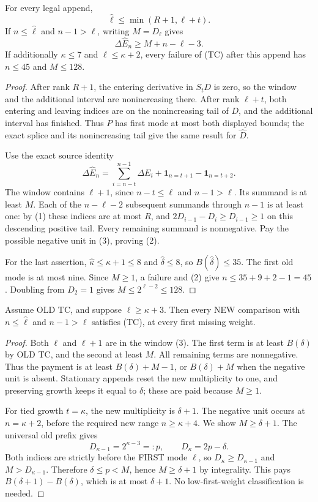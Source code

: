 \begin{lemma}
For every legal append,
\[
                  \widehat\ell\le\min(R+1,\ell+t).       \tag{1}
\]
If $n\le\widehat\ell$ and $n-1>\ell$, writing $M=D_\ell$ gives
\[
                 \Delta\widehat E_n\ge M+n-\ell-3.       \tag{2}
\]
If additionally $\kappa\le7$ and $\ell\le\kappa+2$, every failure
of (TC) after this append has $n\le45$ and $M\le128$.
\end{lemma}
\begin{proof}
After rank $R+1$, the entering derivative in $S_tD$ is zero, so
the window and the additional interval are nonincreasing there.
After rank $\ell+t$, both entering and leaving indices are on the
nonincreasing tail of $D$, and the additional interval has finished.
Thus $P$ has first mode at most both displayed bounds; the exact
splice and its nonincreasing tail give the same result for $\widehat D$.

Use the exact source identity
\[
 \Delta\widehat E_n=\sum_{i=n-t}^{n-1}\Delta E_i
              +\mathbf1_{n=t+1}-\mathbf1_{n=t+2}.       \tag{3}
\]
The window contains $\ell+1$, since $n-t\le\ell$ and
$n-1>\ell$. Its summand is at least $M$.
Each of the $n-\ell-2$ subsequent summands through $n-1$ is
at least one: by (1) these indices are at most $R$, and
$2D_{i-1}-D_i\ge D_{i-1}\ge1$ on this descending positive tail.
Every remaining summand is nonnegative. Pay the possible negative
unit in (3), proving (2).

For the last assertion, $\widehat\kappa\le\kappa+1\le8$ and
$\widehat\delta\le8$, so $B(\widehat\delta)\le35$.
The first old mode is at most nine. Since $M\ge1$, a failure
and (2) give $n\le35+9+2-1=45$.
Doubling from $D_2=1$ gives $M\le2^{\ell-2}\le128$.
\end{proof}

\begin{lemma}
Assume OLD TC, and suppose $\ell\ge\kappa+3$.
Then every NEW comparison with $n\le\widehat\ell$ and $n-1>\ell$
satisfies (TC), at every first missing weight.
\end{lemma}
\begin{proof}
Both $\ell$ and $\ell+1$ are in the window (3). The first term
is at least $B(\delta)$ by OLD TC, and the second at least $M$.
All remaining terms are nonnegative. Thus the payment is at least
$B(\delta)+M-1$, or $B(\delta)+M$ when the negative unit is absent.
Stationary appends reset the new multiplicity to one, and preserving
growth keeps it equal to $\delta$; these are paid because $M\ge1$.

For tied growth $t=\kappa$, the new multiplicity is $\delta+1$.
The negative unit occurs at $n=\kappa+2$, before the required
new range $n\ge\kappa+4$. We show $M\ge\delta+1$.
The universal old prefix gives
\[
       D_{\kappa-1}=2^{\kappa-3}=:p,
              \qquad D_\kappa=2p-\delta.
\]
Both indices are strictly before the FIRST mode $\ell$, so
$D_\kappa\ge D_{\kappa-1}$ and $M>D_{\kappa-1}$.
Therefore $\delta\le p<M$, hence $M\ge\delta+1$ by integrality.
This pays $B(\delta+1)-B(\delta)$, which is at most $\delta+1$.
No low-first-weight classification is needed.
\end{proof}


